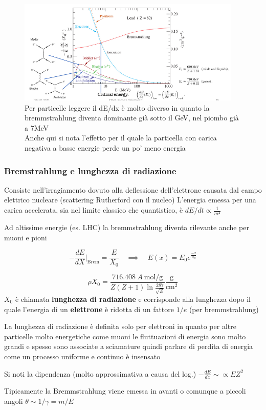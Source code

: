 \begin{figure}[H]
    \centering
    \includegraphics[width=0.95\textwidth,frame]{Chapters/images/Interazione_radiazione_materia/image-20220217021527324.png}
    \captionsetup{width=0.95\linewidth}
    \caption{Per particelle leggere il dE/dx è molto diverso in quanto la bremmstrahlung diventa dominante già sotto il GeV, nel piombo già a 7MeV \\ Anche qui si nota l'effetto per il quale la particella con carica negativa a basse energie perde un po' meno energia}
    \label{fig:electronloss}
\end{figure}
\subsubsection*{Bremstrahlung e lunghezza di radiazione}
Consiste nell'irragiamento dovuto alla deflessione dell'elettrone causata dal campo elettrico nucleare (scattering Rutherford con il nucleo)
\newline
L'energia emessa per una carica accelerata, sia nel limite classico che quantistico, è $dE/dt \propto \frac{1}{m^2}$

\begin{note}
    Ad altissime energie (es. LHC) la bremmstrahlung diventa rilevante anche per muoni e pioni
\end{note}

\[-\frac{dE}{dX} \Bigr|_\text{Brem} =\frac{E}{X_{0}} \quad \implies \quad  E(x) = E_{0} e^{\frac{-x}{X_{0} }} \]

\[\rho X_{0} =\frac{716.408 \: A \: \text{mol/g}}{Z(Z+1)\ln \frac{287}{\sqrt{Z} }} \frac{\text{g} }{\text{cm}^{2}  }
    \]
 $X_0$ è chiamata \textbf{lunghezza di radiazione} e corrisponde alla lunghezza dopo il quale l'energia di un \textbf{elettrone} è ridotta di un fattore $1/e$ (per bremmstrahlung)

\begin{note}
    La lunghezza di radiazione è definita solo per elettroni in quanto per altre particelle molto energetiche come muoni le fluttuazioni di energia sono molto grandi e spesso sono associate a sciamature quindi parlare di perdita di energia come un processo uniforme e continuo è insensato
\end{note}
\begin{remark}

    Si noti la dipendenza (molto approssimativa a causa del log.) $-\frac{dE}{dx} \sim \propto E Z^2$

\end{remark}
Tipicamente la Bremmstrahlung viene emessa in avanti o comunque a piccoli angoli $\theta \sim1/\gamma=m/E$


